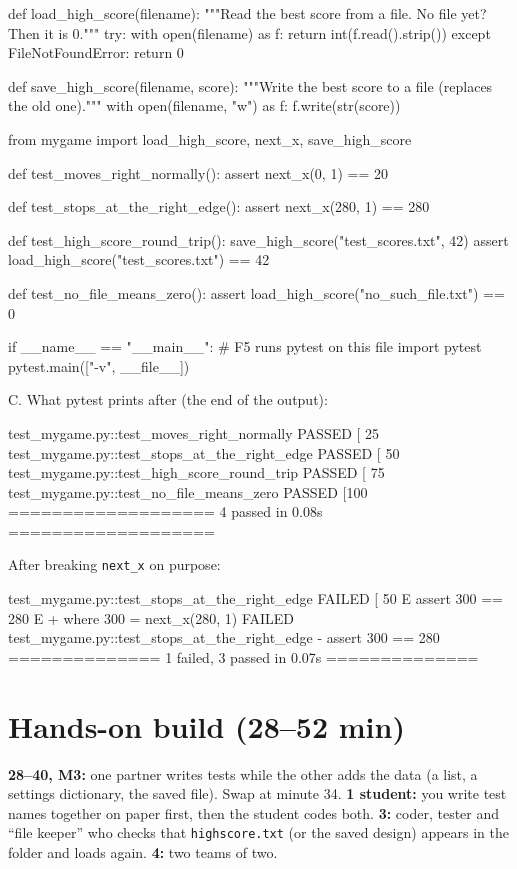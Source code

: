 \begin{pycode}
def load_high_score(filename):
    """Read the best score from a file. No file yet? Then it is 0."""
    try:
        with open(filename) as f:
            return int(f.read().strip())
    except FileNotFoundError:
        return 0

def save_high_score(filename, score):
    """Write the best score to a file (replaces the old one)."""
    with open(filename, "w") as f:
        f.write(str(score))
\end{pycode}
\begin{pycode}
from mygame import load_high_score, next_x, save_high_score

def test_moves_right_normally():
    assert next_x(0, 1) == 20

def test_stops_at_the_right_edge():
    assert next_x(280, 1) == 280

def test_high_score_round_trip():
    save_high_score("test_scores.txt", 42)
    assert load_high_score("test_scores.txt") == 42

def test_no_file_means_zero():
    assert load_high_score("no_such_file.txt") == 0

if __name__ == "__main__":       # F5 runs pytest on this file
    import pytest
    pytest.main(["-v", __file__])
\end{pycode}
C. What pytest prints after  (the end of the output):
\begin{outputcode}
test_mygame.py::test_moves_right_normally PASSED        [ 25%
test_mygame.py::test_stops_at_the_right_edge PASSED     [ 50%
test_mygame.py::test_high_score_round_trip PASSED       [ 75%
test_mygame.py::test_no_file_means_zero PASSED          [100%
=================== 4 passed in 0.08s ===================
\end{outputcode}
After breaking \texttt{next\_x} on purpose:
\begin{outputcode}
test_mygame.py::test_stops_at_the_right_edge FAILED     [ 50%
E       assert 300 == 280
E        +  where 300 = next_x(280, 1)
FAILED test_mygame.py::test_stops_at_the_right_edge - assert 300 == 280
============== 1 failed, 3 passed in 0.07s ==============
\end{outputcode}

\section{Hands-on build (28--52 min)}
\begin{pairroles}
\textbf{28--40, M3:} one partner writes tests while the other adds the data (a list, a settings
dictionary, the saved file). Swap at minute 34. \textbf{1 student:} you write test names together
on paper first, then the student codes both. \textbf{3:} coder, tester and \enquote{file keeper} who
checks that \texttt{highscore.txt} (or the saved design) appears in the folder and loads again.
\textbf{4:} two teams of two.
\end{pairroles}

